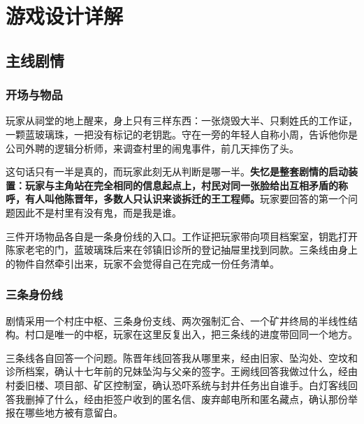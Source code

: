 %
%

\chapter{游戏设计详解}

\section{主线剧情}
\subsection{开场与物品}

玩家从祠堂的地上醒来，身上只有三样东西：一张烧毁大半、只剩姓氏的工作证，一颗蓝玻璃珠，一把没有标记的老钥匙。守在一旁的年轻人自称小周，告诉他你是公司外聘的逻辑分析师，来调查村里的闹鬼事件，前几天摔伤了头。

这句话只有一半是真的，而玩家此刻无从判断是哪一半。\textbf{失忆是整套剧情的启动装置：玩家与主角站在完全相同的信息起点上，村民对同一张脸给出互相矛盾的称呼，有人叫他陈晋年，多数人只认识来谈拆迁的王工程师。}玩家要回答的第一个问题因此不是村里有没有鬼，而是我是谁。

三件开场物品各自是一条身份线的入口。工作证把玩家带向项目档案室，钥匙打开陈家老宅的门，蓝玻璃珠后来在邻镇旧诊所的登记抽屉里找到同款。三条线由身上的物件自然牵引出来，玩家不会觉得自己在完成一份任务清单。

\subsection{三条身份线}

剧情采用一个村庄中枢、三条身份支线、两次强制汇合、一个矿井终局的半线性结构。村口是唯一的中枢，玩家在这里反复出入，把三条线的进度带回同一个地方。

三条线各自回答一个问题。陈晋年线回答我从哪里来，经由旧家、坠沟处、空坟和诊所档案，确认十七年前的兄妹坠沟与父亲的签字。王阙线回答我做过什么，经由村委旧楼、项目部、矿区控制室，确认恐吓系统与封井任务出自谁手。白灯客线回答我删掉了什么，经由拒签户收到的匿名信、废弃邮电所和匿名藏点，确认那份举报在哪些地方被有意留白。


